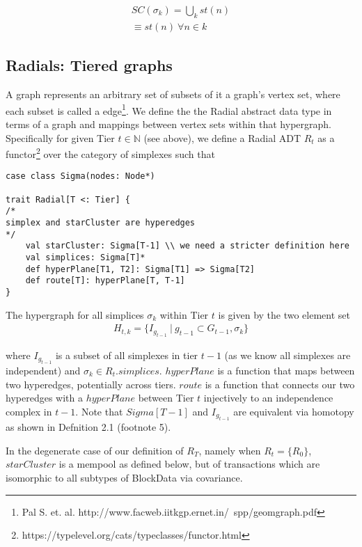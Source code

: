 \documentclass{article}
\begin{document}
\begin{equation} \label{eq1}
\begin{split}
SC(\sigma_k) = \bigcup_k st(n) \\
\equiv st(n) \ \forall n \in k
\end{split}
\end{equation}

\subsection{Radials: Tiered graphs}
A graph represents an arbitrary set of subsets of it a graph's vertex set, where each subset is called a edge\footnote{Pal S. et. al. http://www.facweb.iitkgp.ernet.in/~spp/geomgraph.pdf}. We define the the Radial abstract data type in terms of a graph and mappings between vertex sets within that hypergraph. Specifically for given Tier $t \in \mathbb{N}$ (see above), we define a Radial ADT $R_t$ as a functor\footnote{https://typelevel.org/cats/typeclasses/functor.html} over the category of simplexes such that

\begin{lstlisting}
case class Sigma(nodes: Node*)

trait Radial[T <: Tier] {
/*
simplex and starCluster are hyperedges
*/
	val starCluster: Sigma[T-1] \\ we need a stricter definition here
	val simplices: Sigma[T]*
	def hyperPlane[T1, T2]: Sigma[T1] => Sigma[T2]
	def route[T]: hyperPlane[T, T-1]
}
\end{lstlisting}

The hypergraph for all simplices $\sigma_k$ within Tier $t$ is given by the two element set
\begin{equation} \label{eq1}
\begin{split}
H_{t,k} = \{I_{g_{t-1}} \ | \ g_{t-1} \subset G_{t-1}, \sigma_k \}
\end{split}
\end{equation}

where $I_{g_{t-1}}$ is a subset of all simplexes in tier $t-1$ (as we know all simplexes are independent) and $\sigma_k \in R_t.simplices$. $hyperPlane$ is a function that maps between two hyperedges, potentially across tiers. $route$ is a function that connects our two hyperedges with a $hyperPlane$ between Tier $t$ injectively to an independence complex in $t-1$. Note that $Sigma[T-1]$ and $I_{g_{t-1}}$ are equivalent via homotopy as shown in Defnition 2.1 (footnote 5). 

In the degenerate case of our definition of $R_T$, namely when $R_t = \{R_0\}$, $starCluster$ is a mempool as defined below, but of transactions which are isomorphic to all subtypes of BlockData via covariance.
\end{document}
